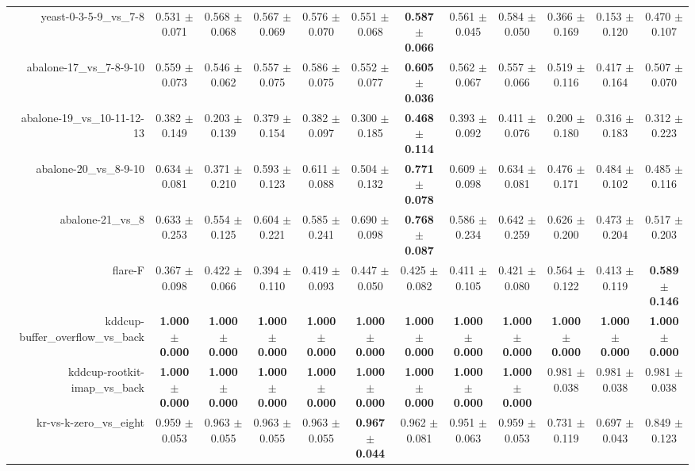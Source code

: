 \begin{table}[!ht]
{\begin{tabular}{r c c c c c c c c c c c}
yeast-0-3-5-9\_vs\_7-8 & 0.531 $\pm$ 0.071 & 0.568 $\pm$ 0.068 & 0.567 $\pm$ 0.069 & 0.576 $\pm$ 0.070 & 0.551 $\pm$ 0.068 & \textbf{0.587 $\pm$ 0.066} & 0.561 $\pm$ 0.045 & 0.584 $\pm$ 0.050 & 0.366 $\pm$ 0.169 & 0.153 $\pm$ 0.120 & 0.470 $\pm$ 0.107 \\
abalone-17\_vs\_7-8-9-10 & 0.559 $\pm$ 0.073 & 0.546 $\pm$ 0.062 & 0.557 $\pm$ 0.075 & 0.586 $\pm$ 0.075 & 0.552 $\pm$ 0.077 & \textbf{0.605 $\pm$ 0.036} & 0.562 $\pm$ 0.067 & 0.557 $\pm$ 0.066 & 0.519 $\pm$ 0.116 & 0.417 $\pm$ 0.164 & 0.507 $\pm$ 0.070 \\
abalone-19\_vs\_10-11-12-13 & 0.382 $\pm$ 0.149 & 0.203 $\pm$ 0.139 & 0.379 $\pm$ 0.154 & 0.382 $\pm$ 0.097 & 0.300 $\pm$ 0.185 & \textbf{0.468 $\pm$ 0.114} & 0.393 $\pm$ 0.092 & 0.411 $\pm$ 0.076 & 0.200 $\pm$ 0.180 & 0.316 $\pm$ 0.183 & 0.312 $\pm$ 0.223 \\
abalone-20\_vs\_8-9-10 & 0.634 $\pm$ 0.081 & 0.371 $\pm$ 0.210 & 0.593 $\pm$ 0.123 & 0.611 $\pm$ 0.088 & 0.504 $\pm$ 0.132 & \textbf{0.771 $\pm$ 0.078} & 0.609 $\pm$ 0.098 & 0.634 $\pm$ 0.081 & 0.476 $\pm$ 0.171 & 0.484 $\pm$ 0.102 & 0.485 $\pm$ 0.116 \\
abalone-21\_vs\_8 & 0.633 $\pm$ 0.253 & 0.554 $\pm$ 0.125 & 0.604 $\pm$ 0.221 & 0.585 $\pm$ 0.241 & 0.690 $\pm$ 0.098 & \textbf{0.768 $\pm$ 0.087} & 0.586 $\pm$ 0.234 & 0.642 $\pm$ 0.259 & 0.626 $\pm$ 0.200 & 0.473 $\pm$ 0.204 & 0.517 $\pm$ 0.203 \\
flare-F & 0.367 $\pm$ 0.098 & 0.422 $\pm$ 0.066 & 0.394 $\pm$ 0.110 & 0.419 $\pm$ 0.093 & 0.447 $\pm$ 0.050 & 0.425 $\pm$ 0.082 & 0.411 $\pm$ 0.105 & 0.421 $\pm$ 0.080 & 0.564 $\pm$ 0.122 & 0.413 $\pm$ 0.119 & \textbf{0.589 $\pm$ 0.146} \\
kddcup-buffer\_overflow\_vs\_back & \textbf{1.000 $\pm$ 0.000} & \textbf{1.000 $\pm$ 0.000} & \textbf{1.000 $\pm$ 0.000} & \textbf{1.000 $\pm$ 0.000} & \textbf{1.000 $\pm$ 0.000} & \textbf{1.000 $\pm$ 0.000} & \textbf{1.000 $\pm$ 0.000} & \textbf{1.000 $\pm$ 0.000} & \textbf{1.000 $\pm$ 0.000} & \textbf{1.000 $\pm$ 0.000} & \textbf{1.000 $\pm$ 0.000} \\
kddcup-rootkit-imap\_vs\_back & \textbf{1.000 $\pm$ 0.000} & \textbf{1.000 $\pm$ 0.000} & \textbf{1.000 $\pm$ 0.000} & \textbf{1.000 $\pm$ 0.000} & \textbf{1.000 $\pm$ 0.000} & \textbf{1.000 $\pm$ 0.000} & \textbf{1.000 $\pm$ 0.000} & \textbf{1.000 $\pm$ 0.000} & 0.981 $\pm$ 0.038 & 0.981 $\pm$ 0.038 & 0.981 $\pm$ 0.038 \\
kr-vs-k-zero\_vs\_eight & 0.959 $\pm$ 0.053 & 0.963 $\pm$ 0.055 & 0.963 $\pm$ 0.055 & 0.963 $\pm$ 0.055 & \textbf{0.967 $\pm$ 0.044} & 0.962 $\pm$ 0.081 & 0.951 $\pm$ 0.063 & 0.959 $\pm$ 0.053 & 0.731 $\pm$ 0.119 & 0.697 $\pm$ 0.043 & 0.849 $\pm$ 0.123 \\

\end{tabular}}
\end{table}
